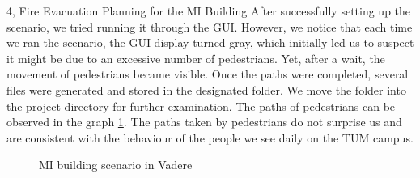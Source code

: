 \begin{task}{4, Fire Evacuation Planning for the MI Building}
After successfully setting up the scenario, we tried running it through the GUI. However, we notice that each time we ran the scenario, the GUI display turned gray, which initially led us to suspect it might be due to an excessive number of pedestrians. Yet, after a wait, the movement of pedestrians became visible. Once the paths were completed, several files were generated and stored in the designated folder. We move the folder into the project directory for further examination. 
The paths of pedestrians can be observed in the graph \ref{mi_building_vedere}. The paths taken by pedestrians do not surprise us and are consistent with the behaviour of the people we see daily on the TUM campus.

\begin{figure}[ht]
\centering

\hfill
{}
\hfill
{}
\caption{MI building scenario in Vadere}
\label{mi_building_vedere}
\end{figure}



\end{task}